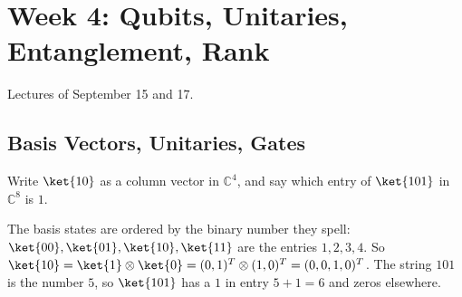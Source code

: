 \section{Week 4: Qubits, Unitaries, Entanglement, Rank}\label{sec:week4}

Lectures of September 15 and 17.

\begin{opentable}
\end{opentable}

\subsection{Basis Vectors, Unitaries, Gates}

\begin{exercisebox}
\begin{pproblem}\label{wp:basis}
    Write $\ket{10}$ as a column vector in $\mathbb{C}^4$, and say which entry of $\ket{101}$ in
    $\mathbb{C}^8$ is $1$.
\end{pproblem}
\tcblower
\begin{wsolution}
    The basis states are ordered by the binary number they spell: $\ket{00}, \ket{01}, \ket{10},
    \ket{11}$ are the entries $1, 2, 3, 4$. So
    $\ket{10} = \ket{1} \otimes \ket{0} = (0, 1)^T \otimes (1, 0)^T = (0, 0, 1, 0)^T$. The string
    $101$ is the number $5$, so $\ket{101}$ has a $1$ in entry $5 + 1 = 6$ and zeros elsewhere.
\end{wsolution}
\end{exercisebox}


